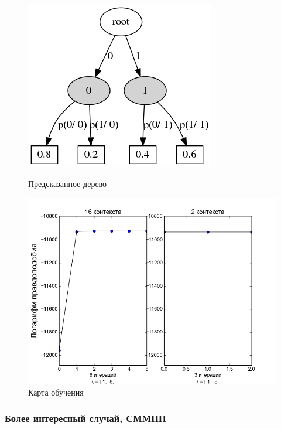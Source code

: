\documentclass{matmex-diploma-custom}
\begin{document}
\begin{enumerate}
\begin{figure}[h!]
\begin{minipage}[b]{0.49 \textwidth}
	\includegraphics[scale=0.4]{img/sample_hmm1/predicted_trie.png}
	\centering
	\caption{ Предсказанное дерево }
	\label{ris:sample_hmm1_predicted_trie}
\end{minipage}
\begin{minipage}[b]{0.49 \textwidth}
	\includegraphics[scale=0.4]{img/sample_hmm1/plot_.png}
	\centering
	\caption{ Карта обучения }
	\label{ris:sample_hmm1_log_likelihood}
\end{minipage}
\end{figure}
\end{enumerate}

\subsubsection{Более интересный случай, СММПП}
\end{document}
